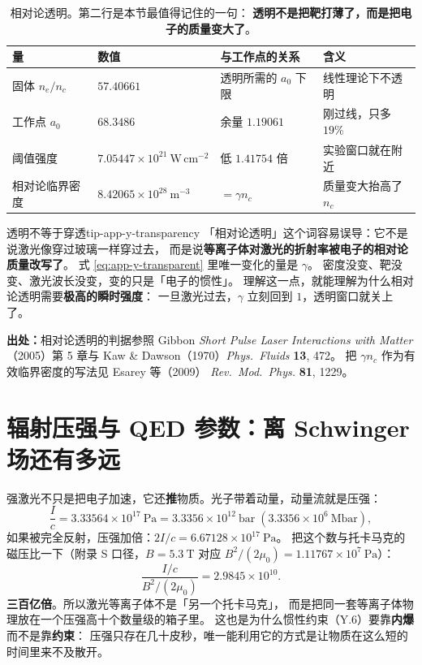 \begin{table}[htbp]
\centering
\small
\caption{相对论透明。第二行是本节最值得记住的一句：
\textbf{透明不是把靶打薄了，而是把电子的质量变大了}。}
\label{tab:app-y-transparency}
\begin{tabular}{p{3.4cm}p{3.3cm}p{3.5cm}p{3.1cm}}
\toprule
量 & 数值 & 与工作点的关系 & 含义 \\
\midrule
固体 $n_e/n_c$ & $57.40661$ & 透明所需的 $a_0$ 下限 & 线性理论下不透明 \\
工作点 $a_0$ & $68.3486$ & 余量 $1.19061$ & 刚过线，只多 $19\%$ \\
阈值强度 & $7.05447\times10^{21}\ \mathrm{W\,cm^{-2}}$ & 低 $1.41754$ 倍 & 实验窗口就在附近 \\
相对论临界密度 & $8.42065\times10^{28}\ \mathrm{m^{-3}}$ & $= \gamma n_c$ & 质量变大抬高了 $n_c$ \\
\bottomrule
\end{tabular}

\end{table}

\begin{tip}{透明不等于穿透}{tip-app-y-transparency}
「相对论透明」这个词容易误导：它不是说激光像穿过玻璃一样穿过去，
而是说\textbf{等离子体对激光的折射率被电子的相对论质量改写了}。
式 \eqref{eq:app-y-transparent} 里唯一变化的量是 $\gamma$。
密度没变、靶没变、激光波长没变，变的只是「电子的惯性」。
理解这一点，就能理解为什么相对论透明需要\textbf{极高的瞬时强度}：
一旦激光过去，$\gamma$ 立刻回到 $1$，透明窗口就关上了。
\end{tip}

{\footnotesize
\textbf{出处：}相对论透明的判据参照 Gibbon \emph{Short Pulse Laser Interactions
with Matter}（2005）第 5 章与 Kaw \& Dawson（1970）\emph{Phys.\ Fluids}
\textbf{13}, 472。
把 $\gamma n_c$ 作为有效临界密度的写法见 Esarey 等（2009）
\emph{Rev.\ Mod.\ Phys.} \textbf{81}, 1229。
}

\section{辐射压强与 QED 参数：离 Schwinger 场还有多远}
\label{sec:app-y-qed}

强激光不只是把电子加速，它还\textbf{推}物质。光子带着动量，动量流就是压强：
\begin{equation}
\frac{I}{c} = 3.33564\times10^{17}\ \mathrm{Pa}
= 3.3356\times10^{12}\ \mathrm{bar}\;(3.3356\times10^{6}\ \mathrm{Mbar}),
\label{eq:app-y-pressure}
\end{equation}
如果被完全反射，压强加倍：$2I/c = 6.67128\times10^{17}\ \mathrm{Pa}$。
把这个数与托卡马克的磁压比一下（附录 S 口径，$B = 5.3\ \mathrm{T}$ 对应
$B^2/(2\mu_0) = 1.11767\times10^{7}\ \mathrm{Pa}$）：
\begin{equation}
\frac{I/c}{B^2/(2\mu_0)} = 2.9845\times10^{10}.
\label{eq:app-y-chi}
\end{equation}
\textbf{三百亿倍}。所以激光等离子体不是「另一个托卡马克」，
而是把同一套等离子体物理放在一个压强高十个数量级的箱子里。
这也是为什么惯性约束（Y.6）要靠\textbf{内爆}而不是靠\textbf{约束}：
压强只存在几十皮秒，唯一能利用它的方式是让物质在这么短的时间里来不及散开。

